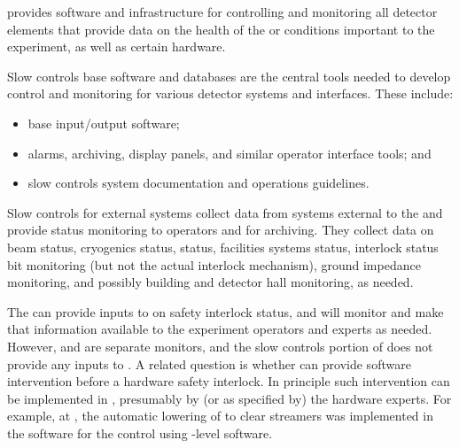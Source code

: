  provides software and infrastructure for controlling and monitoring all detector elements that provide data on the health of the  or conditions important to the experiment, as well as  certain hardware. %

Slow controls base software and databases are the central tools needed to develop
control and monitoring for various detector systems and interfaces. These include:
\begin{itemize}
\item base input/output software;
\item alarms, archiving, display panels, and similar operator interface tools; and 
\item slow controls system documentation and operations guidelines.
\end{itemize}

Slow controls for external systems collect data from systems
external to the  and provide status monitoring to operators
and for archiving. %
They %
collect data on beam status, cryogenics status,
 status, facilities systems status, interlock
status bit monitoring (but not the actual interlock mechanism), ground
impedance monitoring, and possibly building and detector hall
monitoring, as needed. 

The  can provide inputs to  on safety interlock status, and  will monitor and make that information available to the experiment operators and experts as needed. However,  and  are separate monitors, and the slow controls portion of  does not provide any inputs to . A related question is whether  can provide software intervention before a hardware safety interlock. In principle such intervention can be implemented in , presumably by (or as specified by) the hardware experts. For example, at , the automatic lowering of  to clear streamers was implemented in the software for the  control using -level software. 

